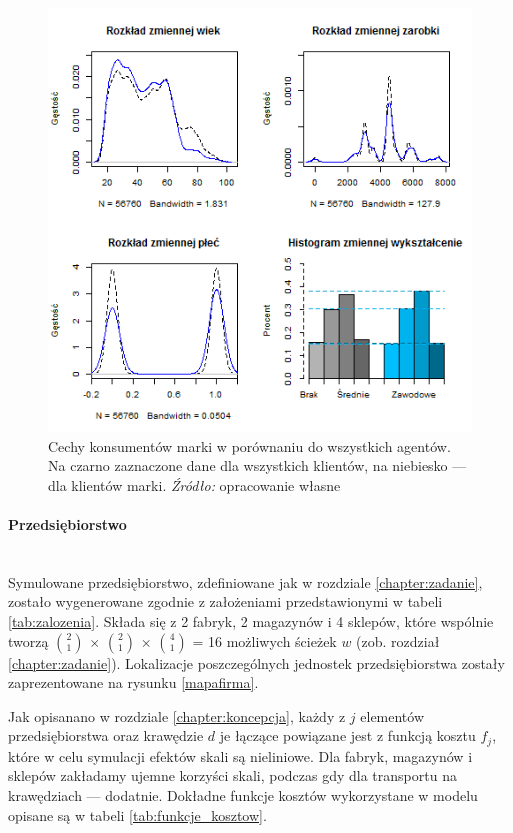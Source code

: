 \documentclass[polish, twoside, 12pt, a4paper]{article}
\theoremstyle{definition}
\theoremstyle{plain}
\theoremstyle{remark}
\begin{document}
\begin{figure}[hbt]
  \centering
    \includegraphics[width=\textwidth]{pictures/profile_klientow.png}
  \captionsetup{margin=10pt,font=small,labelfont=bf,width=.8\textwidth}
  \caption[Cechy konsumentów marki w porównaniu do wszystkich agentów]{Cechy konsumentów marki w porównaniu do wszystkich agentów. Na czarno zaznaczone dane dla wszystkich klientów, na niebiesko --- dla klientów marki. \textit{Źródło:} opracowanie własne}\label{profile}
\end{figure}


\paragraph{Przedsiębiorstwo}\mbox{}\\
Symulowane przedsiębiorstwo, zdefiniowane jak w rozdziale \ref{chapter:zadanie}, zostało wygenerowane zgodnie z założeniami przedstawionymi w tabeli \ref{tab:zalozenia}. Składa się z 2 fabryk, 2 magazynów i 4 sklepów, które wspólnie tworzą  $2\choose 1 $ $ \times $ $2\choose 1 $ $ \times $ $4\choose 1 $ = 16 możliwych ścieżek $w$ (zob. rozdział \ref{chapter:zadanie}). Lokalizacje poszczególnych jednostek przedsiębiorstwa zostały zaprezentowane na rysunku \ref{mapafirma}.

Jak opisanano w rozdziale \ref{chapter:koncepcja}, każdy z $j$ elementów przedsiębiorstwa oraz krawędzie $d$ je łączące powiązane jest z funkcją kosztu $f_j$, które w celu symulacji efektów skali są nieliniowe. Dla fabryk, magazynów i sklepów zakładamy ujemne korzyści skali, podczas gdy dla transportu na krawędziach --- dodatnie. Dokładne funkcje kosztów wykorzystane w modelu opisane są w tabeli \ref{tab:funkcje_kosztow}. 
\end{document}
